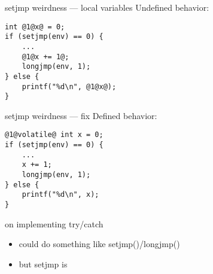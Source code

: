 \begin{frame}[fragile,label=setjmpW]{setjmp weirdness --- local variables}
Undefined behavior:
\begin{lstlisting}
int @1@x@ = 0;
if (setjmp(env) == 0) {
    ...
    @1@x += 1@;
    longjmp(env, 1);
} else {
    printf("%d\n", @1@x@);
}
\end{lstlisting}
\end{frame}

\begin{frame}[fragile,label=setjmpWF]{setjmp weirdness --- fix}
Defined behavior:
\begin{lstlisting}
@1@volatile@ int x = 0;
if (setjmp(env) == 0) {
    ...
    x += 1;
    longjmp(env, 1);
} else {
    printf("%d\n", x);
}
\end{lstlisting}
\end{frame}

\begin{frame}{on implementing try/catch}
\begin{itemize}
\item could do something like setjmp()/longjmp()
\item but setjmp is 
\end{itemize}
\end{frame}
